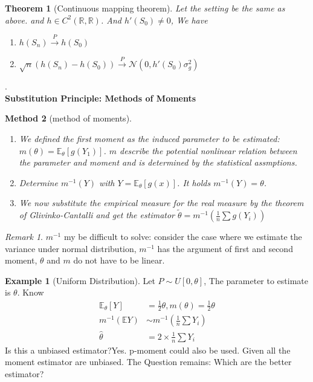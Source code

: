 \documentclass[a4paper,12pt, oneside, fleqn]{book}
\newtheorem{theorem}{Theorem}[section]
\newtheorem{method}[theorem]{Method}
\theoremstyle{definition}
\newtheorem*{example}{Example}
\theoremstyle{remark}
\newtheorem*{remark}{Remark}
\begin{document}
\begin{theorem}[Continuous mapping theorem]
Let the setting be the same as above. and $h \in C^2(\mathbb{R}, \mathbb{R})$. And $h'(S_0) \neq 0$, We have
\begin{enumerate}
	\item $h(S_n) \overset{P}{\longrightarrow} h(S_0)$
	\item $\sqrt{n}(h(S_n) - h(S_0)) \overset{P}{\longrightarrow} \mathcal{N}(0, h'(S_0) \sigma_g^2)$
\end{enumerate}
\end{theorem}
.\\
\textbf{Substitution Principle: Methods of Moments}\\
\begin{method}[method of moments]\quad
\begin{enumerate}
	\item We defined the first moment as the induced parameter to be estimated: $m(\theta) = \mathbb{E}_{\theta}[g(Y_1)]$. $m$ describe the potential nonlinear relation between the parameter and moment and is determined by the statistical assmptions. 
	\item Determine $m^{-1}(Y)$ with $Y = \mathbb{E}_\theta [g(x)]$. It holds $m^{-1}(Y)  = \theta$. 
	\item We now substitute the empirical measure for the real measure by the theorem of Glivinko-Cantalli and get the estimator $\tilde{\theta} = m^{-1}(\frac{1}{n} \sum g(Y_i))$
\end{enumerate}
\end{method} 
\begin{remark}
$m^{-1}$ my be difficult to solve: consider the case where we estimate the variance under normal distribution, $m^{-1}$ has the argument of first and second moment, $\theta$ and $m$ do not have to be linear.	
\end{remark}


\begin{example}[Uniform Distribution]
Let $ P \sim U[0, \theta]$, The parameter to estimate is $\theta$. Know 
\begin{equation*}
	\begin{aligned}
		\mathbb{E}_\theta [Y] &= \frac{1}{2} \theta, m(\theta) = \frac{1}{2}\theta\\
		m^{-1}(\mathbb{E}Y) &\sim m^{-1}(\frac{1}{n}\sum Y_i)\\
		\hat{\theta} &= 2 \times \frac{1}{n} \sum Y_i
	\end{aligned}
\end{equation*}
Is this a unbiased estimator?Yes. p-moment could also be used. Given all the moment estimator are unbiased. The Question remains: Which are the better estimator?
\end{example}
\end{document}
